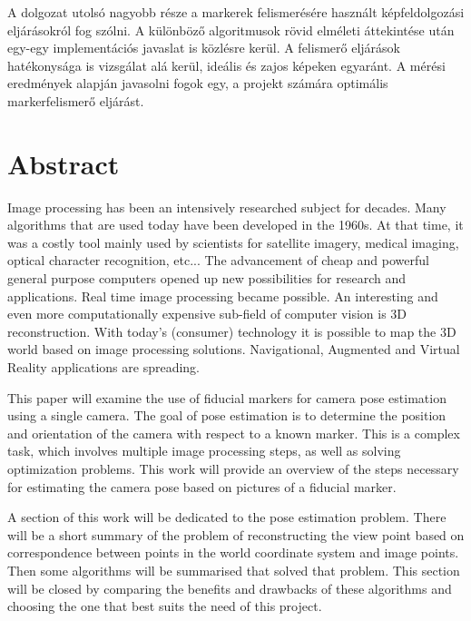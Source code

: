 A dolgozat utolsó nagyobb része a markerek felismerésére használt képfeldolgozási eljárásokról fog szólni.
A különböző algoritmusok rövid elméleti áttekintése után egy-egy implementációs javaslat is közlésre kerül.
A felismerő eljárások hatékonysága is vizsgálat alá kerül, ideális és zajos képeken egyaránt.
A mérési eredmények alapján javasolni fogok egy, a projekt számára optimális markerfelismerő eljárást.
\vfill

\chapter*{Abstract}
Image processing has been an intensively researched subject for decades.
Many algorithms that are used today have been developed in the 1960s.
At that time, it was a costly tool mainly used by scientists for satellite imagery, medical imaging, optical character recognition, etc...
The advancement of cheap and powerful general purpose computers opened up new possibilities for research and applications.
Real time image processing became possible.
An interesting and even more computationally expensive sub-field of computer vision is 3D reconstruction.
With today's (consumer) technology it is possible to map the 3D world based on image processing solutions.
Navigational, Augmented and Virtual Reality applications are spreading.

This paper will examine the use of fiducial markers for camera pose estimation using a single camera.
The goal of pose estimation is to determine the position and orientation of the camera with respect to a known marker.
This is a complex task, which involves multiple image processing steps, as well as solving optimization problems.
This work will provide an overview of the steps necessary for estimating the camera pose based on pictures of a fiducial marker.

A section of this work will be dedicated to the pose estimation problem.
There will be a short summary of the problem of reconstructing the view point based on correspondence between points in the world coordinate system and image points.
Then some algorithms will be summarised that solved that problem.
This section will be closed by comparing the benefits and drawbacks of these algorithms and choosing the one that best suits the need of this project.

